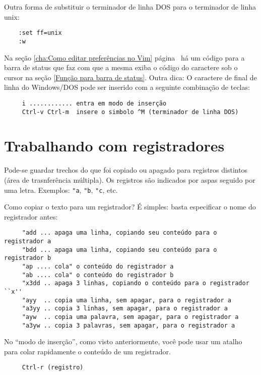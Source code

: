 Outra forma de substituir o terminador de linha DOS para o terminador de linha 
unix:

\begin{verbatim}
    :set ff=unix
    :w
\end{verbatim}

Na seção \ref{cha:Como editar preferências no Vim}
página~\pageref{cha:Como editar preferências no Vim}
há um código para a barra de
status que faz com que a mesma exiba o código do caractere sob o cursor na
seção \ref{Função para barra de status}. Outra dica: O caractere de final de linha
do Windows/DOS pode ser inserido com a seguinte combinação de teclas:

\begin{verbatim}
     i ............ entra em modo de inserção
     Ctrl-v Ctrl-m  insere o simbolo ^M (terminador de linha DOS)
\end{verbatim}

\section{Trabalhando com registradores}
\label{Trabalhando com registradores}

Pode-se guardar trechos do que foi copiado ou apagado para
registros distintos (área de trasnferência múltipla).
Os registros são indicados por aspas seguido por uma letra.
Exemplos: {\tt "a}, {\tt "b}, {\tt "c}, etc.


Como copiar o texto para um registrador? É simples: basta especificar
o nome do registrador antes:

\begin{verbatim}
     "add ... apaga uma linha, copiando seu conteúdo para o registrador a
     "bdd ... apaga uma linha, copiando seu conteúdo para o registrador b
     "ap .... cola" o conteúdo do registrador a
     "ab .... cola" o conteúdo do registrador b
     "x3dd .. apaga 3 linhas, copiando o conteúdo para o registrador ``x''
     "ayy  .. copia uma linha, sem apagar, para o registrador a
     "a3yy .. copia 3 linhas, sem apagar, para o registrador a
     "ayw  .. copia uma palavra, sem apagar, para o registrador a
     "a3yw .. copia 3 palavras, sem apagar, para o registrador a
\end{verbatim}

No ``modo de inserção'', como visto anteriormente, você pode usar um atalho
para colar rapidamente o conteúdo de um registrador.

\begin{verbatim}
     Ctrl-r (registro)
\end{verbatim}


